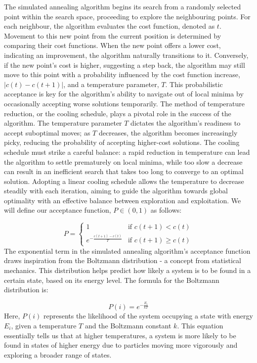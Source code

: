 \documentclass[12pt]{article}
\begin{document}
The simulated annealing algorithm begins its search from a randomly selected point within the search space, proceeding to explore the neighbouring points. For each neighbour, the algorithm evaluates the cost function, denoted as \(t\). Movement to this new point from the current position is determined by comparing their cost functions. When the new point offers a lower cost, indicating an improvement, the algorithm naturally transitions to it. Conversely, if the new point's cost is higher, suggesting a step back, the algorithm may still move to this point with a probability influenced by the cost function increase, \(|c(t) - c(t+1)|\), and a temperature parameter, \(T\). This probabilistic acceptance is key for the algorithm's ability to navigate out of local minima by occasionally accepting worse solutions temporarily. The method of temperature reduction, or the cooling schedule, plays a pivotal role in the success of the algorithm. The temperature parameter \(T\)  dictates the algorithm's readiness to accept suboptimal moves; as \(T\) decreases, the algorithm becomes increasingly picky, reducing the probability of accepting higher-cost solutions. The cooling schedule must strike a careful balance: a rapid reduction in temperature can lead the algorithm to settle prematurely on local minima, while too slow a decrease can result in an inefficient search that takes too long to converge to an optimal solution. Adopting a linear cooling schedule allows the temperature to decrease steadily with each iteration, aiming to guide the algorithm towards global optimality with an effective balance between exploration and exploitation. We will define our acceptance function, $P \in (0,1)$ as follows:

\begin{equation}
    P = \begin{cases}
        1 & \text{if } c(t+1) < c(t) \\
        e^{-\frac{c(t+1) - c(t)}{T}} & \text{if } c(t+1) \geq c(t)
    \end{cases}
    \label{eq:acceptance-function}
\end{equation}
The exponential term in the simulated annealing algorithm's acceptance function draws inspiration from the Boltzmann distribution - a concept from statistical mechanics. This distribution helps predict how likely a system is to be found in a certain state, based on its energy level. The formula for the Boltzmann distribution is:

\begin{equation}
    P(i) = e^{-\frac{E_i}{kT}}
\end{equation}
Here, \(P(i)\) represents the likelihood of the system occupying a state with energy \(E_i\), given a temperature \(T\) and the Boltzmann constant \(k\). This equation essentially tells us that at higher temperatures, a system is more likely to be found in states of higher energy due to particles moving more vigorously and exploring a broader range of states.
\end{document}
